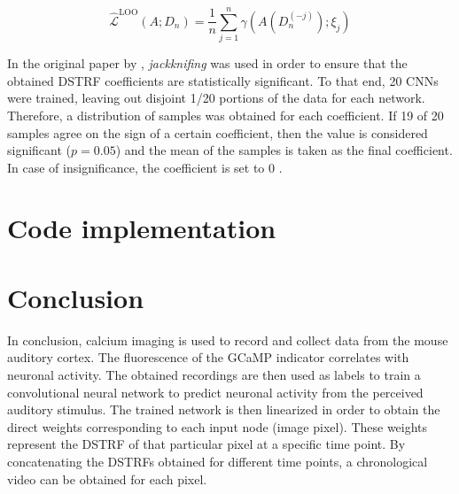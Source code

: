 \begin{equation}
	\hat{\mathcal{L}}^{\mathrm{LOO}}(A; D_n) = \frac{1}{n} \sum_{j=1}^n \gamma \left( A \left( D^{(-j)}_n \right); \xi_j \right)
\end{equation}

In the original paper by \textcite{keshishianEstimatingInterpretingNonlinear2020}, \emph{jackknifing} was used in order to ensure that the obtained DSTRF coefficients are statistically significant. To that end, 20 CNNs were trained, leaving out disjoint 1/20 portions of the data for each network. Therefore, a distribution of samples was obtained for each coefficient. If 19 of 20 samples agree on the sign of a certain coefficient, then the value is considered significant ($p=0.05$) and the mean of the samples is taken as the final coefficient. In case of insignificance, the coefficient is set to 0 \parencite{keshishianEstimatingInterpretingNonlinear2020}.

\section{Code implementation}

\section{Conclusion}
In conclusion, calcium imaging is used to record and collect data from the mouse auditory cortex. The fluorescence of the GCaMP indicator correlates with neuronal activity. The obtained recordings are then used as labels to train a convolutional neural network to predict neuronal activity from the perceived auditory stimulus. The trained network is then linearized in order to obtain the direct weights corresponding to each input node (image pixel). These weights represent the DSTRF of that particular pixel at a specific time point. By concatenating the DSTRFs obtained for different time points, a chronological video can be obtained for each pixel.